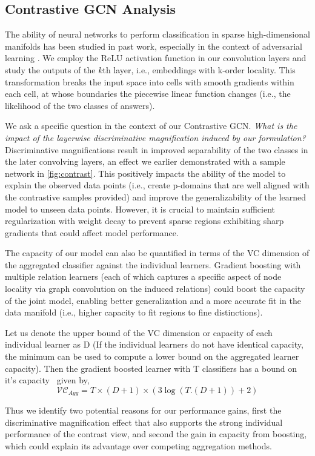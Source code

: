 \subsection{Contrastive GCN Analysis}
\label{ref:analysis}
The ability of neural networks to perform classification in sparse high-dimensional manifolds has been studied in past work, especially in the context of adversarial learning \cite{lu2017safetynet}. We employ the ReLU activation function in our convolution layers and study the outputs of the $k$th layer, i.e., embeddings with k-order locality. This transformation breaks the input space into cells with smooth gradients within each cell, at whose boundaries the piecewise linear function changes (i.e., the likelihood of the two classes of answers).

We ask a specific question in the context of our Contrastive GCN. \emph{What is the impact of the layerwise discriminative magnification induced by our formulation?} Discriminative magnifications result in improved separability of the two classes in the later convolving layers, an effect we earlier demonstrated with a sample network in \cref{fig:contrast}. This positively impacts the ability of the model to explain the observed data points (i.e., create p-domains that are well aligned with the contrastive samples provided) and improve the generalizability of the learned model to unseen data points. However, it is crucial to maintain sufficient regularization with weight decay to prevent sparse regions exhibiting sharp gradients that could affect model performance.

The capacity of our model can also be quantified in terms of the VC dimension of the aggregated classifier against the individual learners. Gradient boosting with multiple relation learners (each of which captures a specific aspect of node locality via graph convolution on the induced relations) could boost the capacity of the joint model, enabling better generalization and a more accurate fit in the data manifold (i.e., higher capacity to fit regions to fine distinctions).

Let us denote the upper bound of the VC dimension or capacity of each individual learner as D (If the individual learners do not have identical capacity, the minimum can be used to compute a lower bound on the aggregated learner capacity). Then the gradient boosted learner with T classifiers has a bound on it's capacity~\cite{shalev2014understanding} given by,
\begin{equation}
\mathcal{VC}_{Agg}  = T \times (D+1) \times(3 \log(T.(D+1))+2)
\label{vcdim}
\end{equation}

Thus we identify two potential reasons for our performance gains, first the discriminative magnification effect that also supports the strong individual performance of the contrast view, and second the gain in capacity from boosting, which could explain its advantage over competing aggregation methods.
